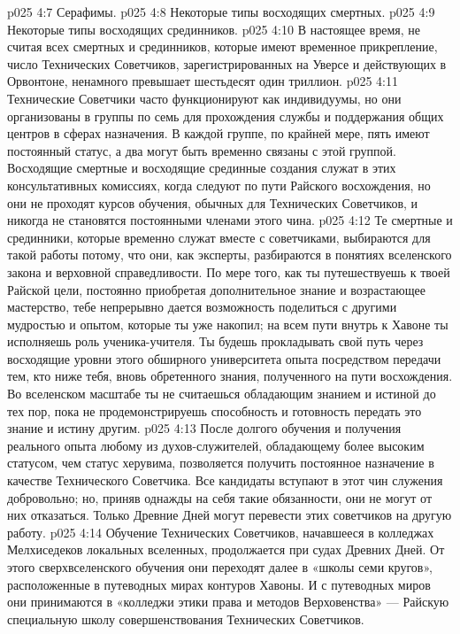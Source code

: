 \vs p025 4:7 \bibnobreakspace Серафимы.
\vs p025 4:8 \bibnobreakspace Некоторые типы восходящих смертных.
\vs p025 4:9 \bibnobreakspace Некоторые типы восходящих срединников.
\vs p025 4:10 \pc В настоящее время, не считая всех смертных и срединников, которые имеют временное прикрепление, число Технических Советчиков, зарегистрированных на Уверсе и действующих в Орвонтоне, ненамного превышает шестьдесят один триллион.
\vs p025 4:11 Технические Советчики часто функционируют как индивидуумы, но они организованы в группы по семь для прохождения службы и поддержания общих центров в сферах назначения. В каждой группе, по крайней мере, пять имеют постоянный статус, а два могут быть временно связаны с этой группой. Восходящие смертные и восходящие срединные создания служат в этих консультативных комиссиях, когда следуют по пути Райского восхождения, но они не проходят курсов обучения, обычных для Технических Советчиков, и никогда не становятся постоянными членами этого чина.
\vs p025 4:12 Те смертные и срединники, которые временно служат вместе с советчиками, выбираются для такой работы потому, что они, как эксперты, разбираются в понятиях вселенского закона и верховной справедливости. По мере того, как ты путешествуешь к твоей Райской цели, постоянно приобретая дополнительное знание и возрастающее мастерство, тебе непрерывно дается возможность поделиться с другими мудростью и опытом, которые ты уже накопил; на всем пути внутрь к Хавоне ты исполняешь роль ученика\hyp{}учителя. Ты будешь прокладывать свой путь через восходящие уровни этого обширного университета опыта посредством передачи тем, кто ниже тебя, вновь обретенного знания, полученного на пути восхождения. Во вселенском масштабе ты не считаешься обладающим знанием и истиной до тех пор, пока не продемонстрируешь способность и готовность передать это знание и истину другим.
\vs p025 4:13 После долгого обучения и получения реального опыта любому из духов\hyp{}служителей, обладающему более высоким статусом, чем статус херувима, позволяется получить постоянное назначение в качестве Технического Советчика. Все кандидаты вступают в этот чин служения добровольно; но, приняв однажды на себя такие обязанности, они не могут от них отказаться. Только Древние Дней могут перевести этих советчиков на другую работу.
\vs p025 4:14 \pc Обучение Технических Советчиков, начавшееся в колледжах Мелхиседеков локальных вселенных, продолжается при судах Древних Дней. От этого сверхвселенского обучения они переходят далее в «школы семи кругов», расположенные в путеводных мирах контуров Хавоны. И с путеводных миров они принимаются в «колледжи этики права и методов Верховенства» --- Райскую специальную школу совершенствования Технических Советчиков.
